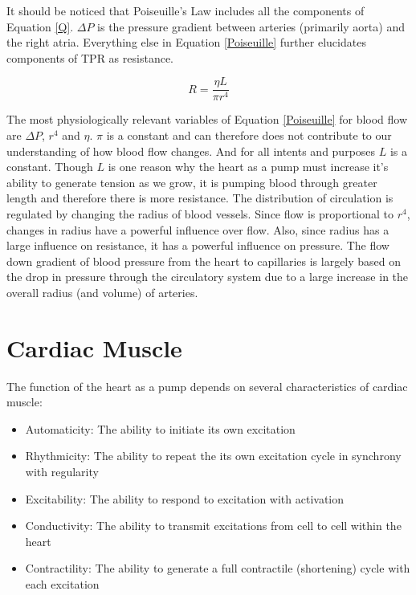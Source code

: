 It should be noticed that Poiseuille's Law includes all the components of Equation \ref{Q}. $\Delta P$ is the pressure gradient between arteries (primarily aorta) and the right atria. Everything else in Equation \ref{Poiseuille} further elucidates components of TPR as resistance.

\begin{equation}
    R = \frac{\eta L}{\pi r^4}
    \label{resistance}
\end{equation}

The most physiologically relevant variables of Equation \ref{Poiseuille} for blood flow are $\Delta P$, $r^4$ and $\eta$. $\pi$ is a constant and can therefore does not contribute to our understanding of how blood flow changes. And for all intents and purposes $L$ is a constant. Though $L$ is one reason why the heart as a pump must increase it's ability to generate tension as we grow, it is pumping blood through greater length and therefore there is more resistance. 
The distribution of circulation is regulated by changing the radius of blood vessels. Since flow is proportional to $r^4$, changes in radius have a powerful influence over flow. Also, since radius has a large influence on resistance, it has a powerful influence on pressure. The flow down gradient of blood pressure from the heart to capillaries is largely based on the drop in pressure through the circulatory system due to a large increase in the overall radius (and volume) of arteries.



\section{Cardiac Muscle}

The function of the heart as a pump depends on several characteristics of cardiac muscle:

\begin{itemize}
    
    \item Automaticity: The ability to initiate its own excitation
    \item Rhythmicity: The ability to repeat the its own excitation cycle in synchrony with regularity
    \item Excitability: The ability to respond to excitation with activation
    \item Conductivity: The ability to transmit excitations from cell to cell within the heart
    \item Contractility: The ability to generate a full contractile (shortening) cycle with each excitation
 
\end{itemize}

